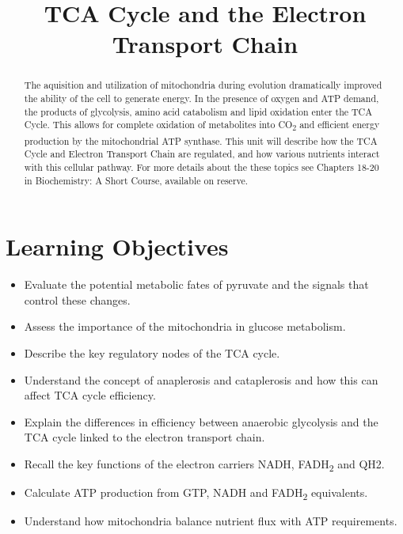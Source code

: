 \documentclass{tufte-handout}
\title{TCA Cycle and the Electron Transport Chain}
\author{}
\date{}  %
\begin{document}
\maketitle%

\begin{abstract}
\noindent The aquisition and utilization of mitochondria during evolution dramatically improved the ability of the cell to generate energy.  In the presence of oxygen and ATP demand, the products of glycolysis, amino acid catabolism and lipid oxidation enter the TCA Cycle.  This allows for complete oxidation of metabolites into CO\textsubscript{2} and efficient energy production by the mitochondrial ATP synthase.  This unit will describe how the TCA Cycle and Electron Transport Chain are regulated, and how various nutrients interact with this cellular pathway.  For more details about the these topics see Chapters 18-20 in Biochemistry: A Short Course\cite{Berg2015}, available on reserve.
\end{abstract}
\tableofcontents
\pagebreak
\section{Learning Objectives}

\begin{itemize}
\item Evaluate the potential metabolic fates of pyruvate and the signals that control these changes.
\item Assess the importance of the mitochondria in glucose metabolism.
\item Describe the key regulatory nodes of the TCA cycle.
\item Understand the concept of anaplerosis and cataplerosis and how this can affect TCA cycle efficiency.
\item Explain the differences in efficiency between anaerobic glycolysis and the TCA cycle linked to the electron transport chain.
\item Recall the key functions of the electron carriers NADH, FADH\textsubscript{2} and QH2.
\item Calculate ATP production from GTP, NADH and FADH\textsubscript{2} equivalents.
\item Understand how mitochondria balance nutrient flux with ATP requirements.
\end{itemize}
\end{document}
